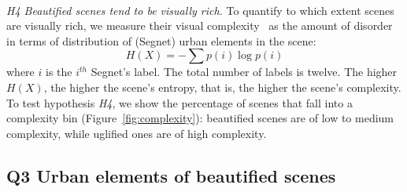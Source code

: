 \mbox{ } \\
\noindent
\emph{H4 Beautified scenes tend to be visually rich.}
To quantify to which extent scenes are visually rich, we measure their visual complexity~\cite{ewing2013measuring} as  the amount of disorder in terms of distribution of (Segnet) urban elements in the scene: 
\begin{equation}
H(X) = -\sum p(i)\log p(i)
\label{eq:entropy} 
\end{equation}
where $i$ is the $i^{th}$ Segnet's label. The total number of labels is twelve. The higher $H(X)$, the  higher the scene's entropy, that is, the higher the scene's complexity. To test hypothesis \emph{H4}, we show the percentage of scenes that fall into a complexity bin  (Figure~\ref{fig:complexity}): beautified scenes are of low to medium complexity, while uglified ones are of high complexity.



\subsection*{Q3 Urban elements of beautified scenes}

\begin{table}[t!]
    \centering
    \caption{Coefficients of logistic regressions run on one pair of predictors at the time.}
    \label{tab:regressioncoef}
    \vspace{-10mm}
\end{table}


